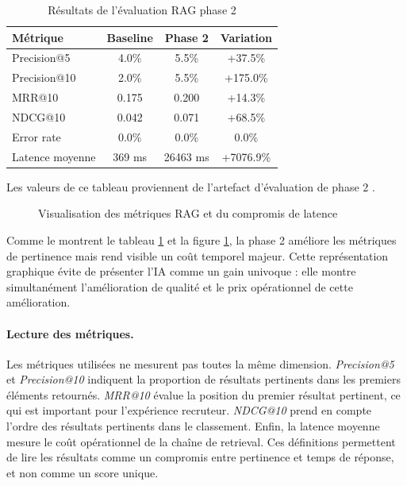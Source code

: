 \begin{table}[H]
  \centering
  \caption{\label{tab:rag-eval-results}Résultats de l'évaluation RAG phase 2}
  \begin{tabular}{lccc}
    \toprule
    Métrique & Baseline & Phase 2 & Variation \\
    \midrule
    Precision@5 & 4.0\% & 5.5\% & +37.5\% \\
    Precision@10 & 2.0\% & 5.5\% & +175.0\% \\
    MRR@10 & 0.175 & 0.200 & +14.3\% \\
    NDCG@10 & 0.042 & 0.071 & +68.5\% \\
    Error rate & 0.0\% & 0.0\% & 0.0\% \\
    Latence moyenne & 369 ms & 26463 ms & +7076.9\% \\
    \bottomrule
  \end{tabular}
\end{table}
Les valeurs de ce tableau proviennent de l'artefact d'évaluation de phase 2 .

\begin{figure}[H]
  \centering
  \caption{\label{fig:rag-eval-bars}Visualisation des métriques RAG et du compromis de latence}
\end{figure}

Comme le montrent le tableau \ref{tab:rag-eval-results} et la figure \ref{fig:rag-eval-bars}, la phase 2 améliore les métriques de pertinence mais rend visible un coût temporel majeur. Cette représentation graphique évite de présenter l'IA comme un gain univoque : elle montre simultanément l'amélioration de qualité et le prix opérationnel de cette amélioration.

\paragraph{Lecture des métriques.}
Les métriques utilisées ne mesurent pas toutes la même dimension. \textit{Precision@5} et \textit{Precision@10} indiquent la proportion de résultats pertinents dans les premiers éléments retournés. \textit{MRR@10} évalue la position du premier résultat pertinent, ce qui est important pour l'expérience recruteur. \textit{NDCG@10} prend en compte l'ordre des résultats pertinents dans le classement. Enfin, la latence moyenne mesure le coût opérationnel de la chaîne de retrieval. Ces définitions permettent de lire les résultats comme un compromis entre pertinence et temps de réponse, et non comme un score unique.


